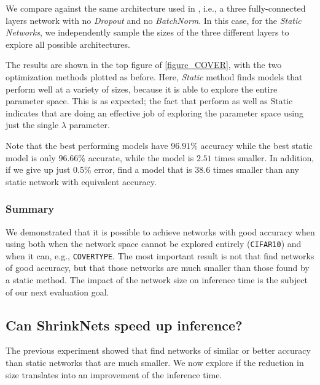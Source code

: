 We compare \shrink against the same architecture
used in \cite{Scardapane2017}, i.e., a three fully-connected layers network with no
\textit{Dropout} \cite{Srivastava2014} and no \textit{BatchNorm}. 
In this case, for the \textit{Static Networks}, we independently sample the
sizes of the three different layers to explore all possible architectures.

The results are shown in the top figure of \cref{figure_COVER}, with the two
optimization methods plotted as before. Here, {\it Static} method finds models
that perform well at a variety of sizes, because it is able to explore the
entire parameter space.  This is as expected;  the fact that \shrink perform
as well as Static indicates that \shrink are doing an effective job of
exploring the parameter space using just the single $\lambda$ parameter.

Note that the best performing \shrink models have $96.91\%$ accuracy while the
best static model is only $96.66\%$ accurate, while the \shrink model is $2.51$
times smaller. In addition, if we give up just 0.5\% error, \shrink find a
model that is 38.6 times smaller than any static network with equivalent accuracy.


\subsubsection{Summary}

We  demonstrated that it is possible to achieve networks with good accuracy
when using \shrink both when the network space cannot be explored entirely
(\texttt{CIFAR10}) and when it can, e.g., \texttt{COVERTYPE}. The most important
result is not that \shrink find networks of good accuracy, but that those
networks are much smaller than those found by a static method. The impact of the
network size on inference time is the subject of our next evaluation goal.


\subsection{Can ShrinkNets speed up inference?}

The previous experiment showed that \shrink find networks of similar or better accuracy
than static networks that are much smaller. We now explore if the reduction in size
translates into an improvement of the inference time.

